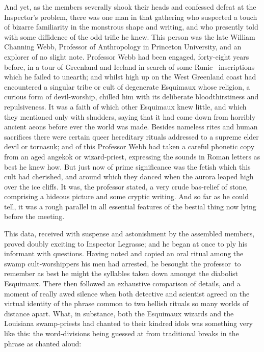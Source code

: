 And yet, as the members severally shook their heads and confessed defeat
at the Inspector's problem, there was one man in that gathering who
suspected a touch of bizarre familiarity in the monstrous shape and
writing, and who presently told with some diffidence of the odd trifle
he knew. This person was the late William Channing Webb, Professor of
Anthropology in Princeton University, and an explorer of no slight note.
Professor Webb had been engaged, forty-eight years before, in a tour of
Greenland and Iceland in search of some Runic \est\ inscriptions which he
failed to unearth; and whilst high up on the West Greenland coast had
encountered a singular tribe or cult of degenerate Esquimaux whose
religion, a curious form of devil-worship, chilled him with its
deliberate bloodthirstiness and repulsiveness. It was a faith of which
other Esquimaux knew little, and which they mentioned only with
shudders, saying that it had come down from horribly ancient aeons
before ever the world was made. Besides nameless rites and human
sacrifices there were certain queer hereditary rituals addressed to a
supreme elder devil or tornasuk; and of this Professor Webb had taken a
careful phonetic copy from an aged angekok or wizard-priest, expressing
the sounds in Roman letters as best he knew how. But just now of prime
significance was the fetish which this cult had cherished, and around
which they danced when the aurora leaped high over the ice cliffs. It
was, the professor stated, a very crude bas-relief of stone, comprising
a hideous picture and some cryptic writing. And so far as he could tell,
it was a rough parallel in all essential features of the bestial thing
now lying before the meeting.

This data, received with suspense and astonishment by the assembled
members, proved doubly exciting to Inspector Legrasse; and he began at
once to ply his informant with questions. Having noted and copied an
oral ritual among the swamp cult-worshippers his men had arrested, he
besought the professor\est\ to remember as best he might the syllables taken
down amongst the diabolist Esquimaux. There then followed an exhaustive
comparison of details, and a moment of really awed silence when both
detective and scientist agreed on the virtual identity of the phrase
common to two hellish rituals so many worlds of distance apart. What, in
substance, both the Esquimaux wizards and the Louisiana swamp-priests
had chanted to their kindred idols was something very like this: the
word-divisions being guessed at from traditional breaks in the phrase as
chanted aloud:

